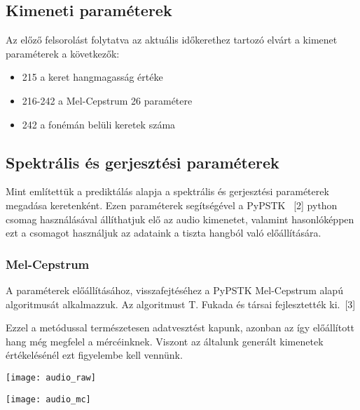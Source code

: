 \subsection{Kimeneti paraméterek}
Az előző felsorolást folytatva az aktuális időkerethez tartozó elvárt a kimenet paraméterek a következők:

 
\begin{itemize}
	\item 215 a keret hangmagasság értéke
	\item 216-242 a Mel-Cepstrum 26 paramétere
	\item 242 a fonémán belüli keretek száma
\end{itemize}
\subsection{Spektrális és gerjesztési paraméterek}
Mint említettük a prediktálás alapja a spektrális és gerjesztési paraméterek megadása keretenként. Ezen paraméterek segítségével a PyPSTK \ [2] python csomag használásával állíthatjuk elő az audio kimenetet, valamint hasonlóképpen ezt a csomagot használjuk az adataink a tiszta hangból való előállítására.
\subsubsection{Mel-Cepstrum}
A paraméterek előállításához, visszafejtéséhez a PyPSTK Mel-Cepstrum alapú algoritmusát alkalmazzuk. Az algoritmust T. Fukada és társai fejlesztették ki.\ [3]


Ezzel a metódussal természetesen adatvesztést kapunk, azonban az így előállított hang még megfelel a mércéinknek. Viszont az általunk generált kimenetek értékelésénél ezt figyelembe kell vennünk.

\texttt{[image: audio\_raw]}

\texttt{[image: audio\_mc]}